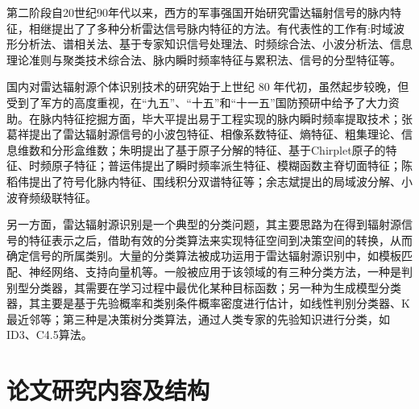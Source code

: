第二阶段自20世纪90年代以来，西方的军事强国开始研究雷达辐射信号的脉内特征，相继提出了了多种分析雷达信号脉内特征的方法。有代表性的工作有:时域波形分析法、谱相关法、基于专家知识信号处理法、时频综合法、小波分析法、信息理论准则与聚类技术综合法、脉内瞬时频率特征与累积法、信号的分型特征等。

国内对雷达辐射源个体识别技术的研究始于上世纪 80 年代初，虽然起步较晚，但受到了军方的高度重视，在“九五”、“十五”和“十一五”国防预研中给予了大力资助。在脉内特征挖掘方面，毕大平提出易于工程实现的脉内瞬时频率提取技术；张葛祥提出了雷达辐射源信号的小波包特征、相像系数特征、熵特征、粗集理论、信息维数和分形盒维数；朱明提出了基于原子分解的特征、基于Chirplet原子的特征、时频原子特征；普运伟提出了瞬时频率派生特征、模糊函数主脊切面特征；陈稻伟提出了符号化脉内特征、围线积分双谱特征等；余志斌提出的局域波分解、小波脊频级联特征。

另一方面，雷达辐射源识别是一个典型的分类问题，其主要思路为在得到辐射源信号的特征表示之后，借助有效的分类算法来实现特征空间到决策空间的转换，从而确定信号的所属类别。大量的分类算法被成功运用于雷达辐射源识别中，如模板匹配、神经网络、支持向量机等。一般被应用于该领域的有三种分类方法，一种是判别型分类器，其需要在学习过程中最优化某种目标函数；另一种为生成模型分类器，其主要是基于先验概率和类别条件概率密度进行估计，如线性判别分类器、K最近邻等；第三种是决策树分类算法，通过人类专家的先验知识进行分类，如ID3、C4.5算法。

\section{论文研究内容及结构}